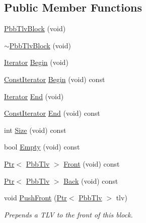 \subsection*{Public Member Functions}
\begin{DoxyCompactItemize}
\item 
\hyperlink{classns3_1_1PbbTlvBlock_ad99d45456a62d157a5b34b22f9552613}{Pbb\+Tlv\+Block} (void)
\item 
\hyperlink{classns3_1_1PbbTlvBlock_afe9b31571ee46c67d8bd0a3bec4adab0}{$\sim$\+Pbb\+Tlv\+Block} (void)
\item 
\hyperlink{classns3_1_1PbbTlvBlock_a50ca1859c6f7425f0c9e2fcb11ded31d}{Iterator} \hyperlink{classns3_1_1PbbTlvBlock_acba5eb3e92a600a4efcd087cee4d0768}{Begin} (void)
\item 
\hyperlink{classns3_1_1PbbTlvBlock_a069f89bd3bb058e9fa72ea464854c01f}{Const\+Iterator} \hyperlink{classns3_1_1PbbTlvBlock_a0a7ea6e15ee4cbb243763a89c678fa8a}{Begin} (void) const 
\item 
\hyperlink{classns3_1_1PbbTlvBlock_a50ca1859c6f7425f0c9e2fcb11ded31d}{Iterator} \hyperlink{classns3_1_1PbbTlvBlock_a5c9d6c71ab0e3776ee45835b699aae20}{End} (void)
\item 
\hyperlink{classns3_1_1PbbTlvBlock_a069f89bd3bb058e9fa72ea464854c01f}{Const\+Iterator} \hyperlink{classns3_1_1PbbTlvBlock_a21a15da4c61cde48833fba8ad962ed98}{End} (void) const 
\item 
int \hyperlink{classns3_1_1PbbTlvBlock_a8edb78fa2bb0a97f62275a4e899328d9}{Size} (void) const 
\item 
bool \hyperlink{classns3_1_1PbbTlvBlock_a0f9e2a9bffc4b0363463424bf8dac12f}{Empty} (void) const 
\item 
\hyperlink{classns3_1_1Ptr}{Ptr}$<$ \hyperlink{classns3_1_1PbbTlv}{Pbb\+Tlv} $>$ \hyperlink{classns3_1_1PbbTlvBlock_a3ff00bfecd6e8231cd9227e6b2aca20e}{Front} (void) const 
\item 
\hyperlink{classns3_1_1Ptr}{Ptr}$<$ \hyperlink{classns3_1_1PbbTlv}{Pbb\+Tlv} $>$ \hyperlink{classns3_1_1PbbTlvBlock_a941ba3629bf52e046d604e44af96f5a2}{Back} (void) const 
\item 
void \hyperlink{classns3_1_1PbbTlvBlock_a3c4e94e21f6075a3268de8bc1ccc5708}{Push\+Front} (\hyperlink{classns3_1_1Ptr}{Ptr}$<$ \hyperlink{classns3_1_1PbbTlv}{Pbb\+Tlv} $>$ tlv)
\begin{DoxyCompactList}\small\item\em Prepends a T\+LV to the front of this block. \end{DoxyCompactList}\item 

\end{DoxyCompactItemize}
